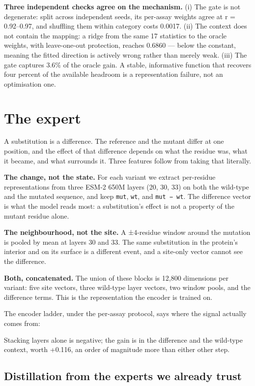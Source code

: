 \documentclass{article}
\begin{document}
\textbf{Three independent checks agree on the mechanism.} (i) The gate is not degenerate: split across
independent seeds, its per-assay weights agree at r = 0.92--0.97, and shuffling them within category
costs 0.0017. (ii) The context does not contain the mapping: a ridge from the same 17 statistics to the
oracle weights, with leave-one-out protection, reaches 0.6860 --- below the constant, meaning the fitted
direction is actively wrong rather than merely weak. (iii) The gate captures 3.6\% of the oracle gain.
A stable, informative function that recovers four percent of the available headroom is a representation
failure, not an optimisation one.

\section{The expert}\label{the-expert}

A substitution is a difference. The reference and the mutant differ at one position, and the effect of
that difference depends on what the residue was, what it became, and what surrounds it. Three features
follow from taking that literally.

\textbf{The change, not the state.} For each variant we extract per-residue representations from three ESM-2 650M layers \cite{esm2}
(20, 30, 33) on both the wild-type and the mutated sequence, and keep \texttt{mut}, \texttt{wt}, and
\texttt{mut\ −\ wt}. The difference vector is what the model reads most: a substitution's effect is not a
property of the mutant residue alone.

\textbf{The neighbourhood, not the site.} A ±4-residue window around the mutation is pooled by mean at layers
30 and 33. The same substitution in the protein's interior and on its surface is a different event, and
a site-only vector cannot see the difference.

\textbf{Both, concatenated.} The union of these blocks is 12,800 dimensions per variant: five site vectors,
three wild-type layer vectors, two window pools, and the difference terms. This is the representation the
encoder is trained on.

The encoder ladder, under the per-assay protocol, says where the signal actually comes from:



Stacking layers alone is negative; the gain is in the difference and the wild-type context, worth
+0.116, an order of magnitude more than either other step.

\subsection{Distillation from the experts we already trust}\label{distillation-from-the-experts-we-already-trust}
\end{document}

